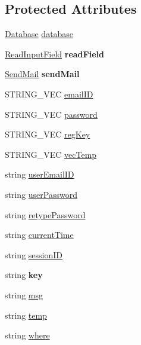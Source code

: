 \subsection*{Protected Attributes}
\begin{DoxyCompactItemize}
\item 
\hyperlink{classDatabase}{Database} \hyperlink{classUser_ae693492927dc1ebbca8407137d1f78d3}{database}
\item 
\hypertarget{classUser_a597b9af071a70e4c8b667b8a3a809748}{\hyperlink{classReadInputField}{Read\-Input\-Field} {\bfseries read\-Field}}\label{classUser_a597b9af071a70e4c8b667b8a3a809748}

\item 
\hypertarget{classUser_a153c98de993eed5e0766d2f2610df108}{\hyperlink{classSendMail}{Send\-Mail} {\bfseries send\-Mail}}\label{classUser_a153c98de993eed5e0766d2f2610df108}

\item 
S\-T\-R\-I\-N\-G\-\_\-\-V\-E\-C \hyperlink{classUser_a2bc69a747b93045d1dce16bd5cd00b9b}{email\-I\-D}
\item 
S\-T\-R\-I\-N\-G\-\_\-\-V\-E\-C \hyperlink{classUser_a77b451700a9695b2a0905a12f8aedd44}{password}
\item 
S\-T\-R\-I\-N\-G\-\_\-\-V\-E\-C \hyperlink{classUser_a8753abeefb69d3c9db3c585992c7944f}{reg\-Key}
\item 
S\-T\-R\-I\-N\-G\-\_\-\-V\-E\-C \hyperlink{classUser_addb446e2ea86d984e243909311967052}{vec\-Temp}
\item 
string \hyperlink{classUser_a18c8f47943a8ebefcdaa709636a53e81}{user\-Email\-I\-D}
\item 
string \hyperlink{classUser_aabe10090d6867d81bc17dd6c362196e8}{user\-Password}
\item 
string \hyperlink{classUser_af51ac37cc65721f03e592311d7ead4d4}{retype\-Password}
\item 
string \hyperlink{classUser_a55989a6bc06339e3dc1de6aa5dc25c38}{current\-Time}
\item 
string \hyperlink{classUser_ab60b88d500e9575634790a518dc584d7}{session\-I\-D}
\item 
\hypertarget{classUser_a53621db039b9952bb48e2bac0bfaa9bf}{string {\bfseries key}}\label{classUser_a53621db039b9952bb48e2bac0bfaa9bf}

\item 
string \hyperlink{classUser_ac46bf208ffc0525d4f637b8458bdb49e}{msg}
\item 
string \hyperlink{classUser_a03e84c43560a0cd720fbff832ade1d08}{temp}
\item 
string \hyperlink{classUser_aaa4322929700c09aad2594331d3c2071}{where}
\end{DoxyCompactItemize}


